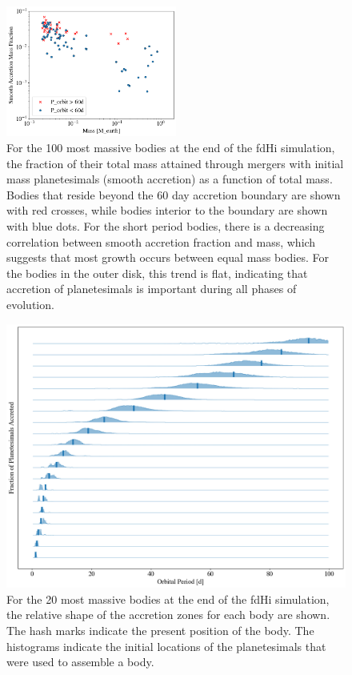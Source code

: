 \documentclass[twocolumn,linenumbers]{aastex63}
\begin{document}
\begin{figure}
\begin{center}
    \includegraphics[width=0.5\textwidth]{figures/minor_frac.png}
    \caption{For the 100 most massive bodies at the end of the fdHi simulation, the fraction of their total mass attained through mergers with initial mass planetesimals (smooth accretion) as a function of total mass. Bodies that reside beyond the 60 day accretion boundary are shown with red crosses, while bodies interior to the boundary are shown with blue dots. For the short period bodies, there is a decreasing correlation between smooth accretion fraction and mass, which suggests that most growth occurs between equal mass bodies. For the bodies in the outer disk, this trend is flat, indicating that accretion of planetesimals is important during all phases of evolution.\label{fig:minor_frac}}
\end{center}
\end{figure}

\begin{figure}
\begin{center}
    \includegraphics[width=\textwidth]{figures/acc_zones.png}
    \caption{For the 20 most massive bodies at the end of the fdHi simulation, the relative shape of the accretion zones for each body are shown. The hash marks indicate the present position of the body. The histograms indicate the initial locations of the planetesimals that were used to assemble a body.\label{fig:acc_zones}}
\end{center}
\end{figure}
\end{document}
